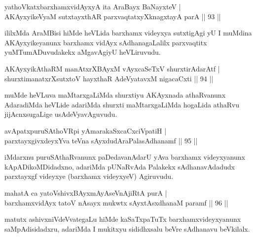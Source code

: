 \begin{shl}
yathoVkatxbarxhamxvidAyxyA ita AraBayx BaNayxteV |\\
AKAyxyikeVyaM sutxtayxthAR parxvaqtatxyXknagxtayA parA \hfill || 93 ||
\end{shl}

\begin{artha}
ililxMda AraMBisi hiMde heVLida barxhamx videyxya sutxtigAgi yU I muMdina AKAyxyikeyanunx barxhamx vidAyx sAdhanagaLalilx parxvaqtitx yuMTumADuvudakekx aMgavAgiyU heVLiruvudu.
\end{artha}


\begin{shl}
AKAyxyikAthaRM manAtxrXBAyxM vAyxcaSeTxV shurxtirAdarAtf |\\
shurxtimanatxrXsutxtoV hayxthaR AdeVyatavxM nigacaCxti \hfill || 94 ||
\end{shl}

\begin{artha}
muMde heVLuva maMtarxgaLiMda shurxtiyu AKAyxnada athaRvanunx AdaradiMda heVLide adariMda shurxti maMtarxgaLiMda hogaLida athaRvu jijAcnxsugaLige usAdeVyavAguvudu.
\end{artha}


\begin{shl}
avApatxpuruSAthoVR\s pi yAmarakaSxcaCxciVpatiH |\\
parxtayxgivxdeyxYva teVna sAyxdudAraPalasAdhanamf \hfill || 95 ||
\end{shl}

\begin{artha}
iMdarxnu puruSAthaRvanunx paDedavanAdarU yAva barxhamx videyxyanunx kApADikoMDidadxno, adariMda pUNaRvAda Palakekx sAdhanavAdadudx parxtayxgf videyxye (barxhamx videyxyeV) Agiruvudu.
\end{artha}

\begin{shl}
mahatA ca yatoV\s shivxBAyxmAyAseVnAjiRtA purA |\\
barxhamxvidAyx tatoV nAsayx mukwtx sAyxtAsxdhanaM paramf \hfill || 96 ||
\end{shl}

\begin{artha}
matutx ashivxniVdeVvategaLu hiMde kaSaTxpaTuTx barxhamxvideyxyanunx saMpAdisidadxru, adariMda I mukitxyu sididhxsalu beVre sAdhanavu beVkilalx.
\end{artha}

